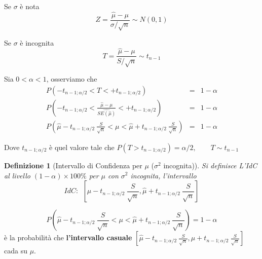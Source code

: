 \documentclass[
  11pt,
]{book}
\theoremstyle{mytheoremstyle}
\theoremstyle{mydefstyle}
\newtheorem{definition}{Definizione}[section]
\begin{document}
Se \(\sigma\) è nota
\[Z=\frac{\hat \mu-\mu}{\sigma/\sqrt n}\sim N(0,1)\]

Se \(\sigma\) è incognita
\[T=\frac{\hat \mu-\mu}{S/\sqrt n}\sim t_{n-1}\]

Sia \(0<\alpha<1\), osserviamo che
\begin{eqnarray*}
  P(-t_{n-1;\alpha/2}<T<+t_{n-1;\alpha/2}) &=& 1-\alpha \\
  P\left(-t_{n-1;\alpha/2}<\frac{\hat \mu -\mu}{\widehat{SE(\hat \mu)}}< +t_{n-1;\alpha/2}\right) &=& 1-\alpha \\
  P\left(\hat \mu- t_{n-1;\alpha/2}~\frac S{\sqrt n}<\mu<\hat \mu+t_{n-1;\alpha/2}~\frac S{\sqrt n}\right) &=& 1-\alpha
\end{eqnarray*}

Dove \(t_{n-1;\alpha/2}\) è quel valore tale che \(P(T>t_{n-1;\alpha/2})=\alpha/2,\qquad T\sim t_{n-1}\)

\begin{info}

\begin{definition}[Intervallo di Confidenza per $\mu$ ($\sigma^2$ incognita)]
Si definisce L'IdC al livello \((1-\alpha)\times100\%\) per \(\mu\) con \(\sigma^2\) incognita, l'intervallo
\[IdC:~~\left[\hat \mu- t_{n-1;\alpha/2}~\frac S{\sqrt n},\hat \mu+ t_{n-1;\alpha/2}~\frac S{\sqrt n}\right]\]
\end{definition}

\end{info}

\[  P\left(\hat \mu- t_{n-1;\alpha/2}~\frac S{\sqrt n}<\mu<\hat \mu+t_{n-1;\alpha/2}~\frac S{\sqrt n}\right) = 1-\alpha\]
è la probabilità che \textbf{l'intervallo casuale} \(\left[\hat \mu- t_{n-1;\alpha/2}~\frac S{\sqrt n},\hat \mu+ t_{n-1;\alpha/2}~\frac S{\sqrt n}\right]\) cada su \(\mu\).
\end{document}
